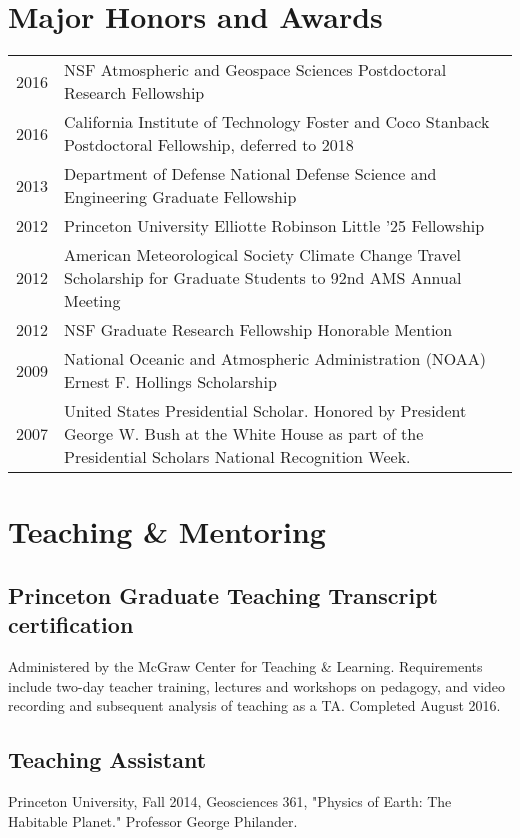 \documentclass{article}
\begin{document}
\section*{Major Honors and Awards}
\label{sec:orgheadline14}
\begin{center}
\begin{tabularx}{\textwidth}{lX}
2016 & NSF Atmospheric and Geospace Sciences Postdoctoral Research Fellowship\\
2016 & California Institute of Technology Foster and Coco Stanback Postdoctoral Fellowship, deferred to 2018\\
2013 & Department of Defense National Defense Science and Engineering Graduate Fellowship\\
2012 & Princeton University Elliotte Robinson Little '25 Fellowship\\
2012 & American Meteorological Society Climate Change Travel Scholarship for Graduate Students to 92nd AMS Annual Meeting\\
2012 & NSF Graduate Research Fellowship Honorable Mention\\
2009 & National Oceanic and Atmospheric Administration (NOAA) Ernest F. Hollings Scholarship\\
2007 & United States Presidential Scholar.  Honored by President George W. Bush at the White House as part of the Presidential Scholars National Recognition Week.\\
\end{tabularx}
\end{center}
\section*{Teaching \& Mentoring}
\label{sec:orgheadline18}
\subsection*{Princeton Graduate Teaching Transcript certification}
\label{sec:orgheadline15}
Administered by the McGraw Center for Teaching \& Learning.  Requirements include
two-day teacher training, lectures and workshops on pedagogy, and video recording
and subsequent analysis of teaching as a TA.  Completed August 2016.
\subsection*{Teaching Assistant}
\label{sec:orgheadline16}
Princeton University, Fall 2014, Geosciences 361, "Physics of Earth: The
Habitable Planet."  Professor George Philander.
\end{document}
